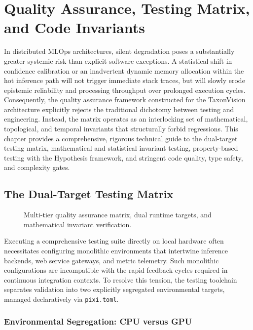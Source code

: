 \chapter{Quality Assurance, Testing Matrix, and Code Invariants}
\label{ch:quality_assurance}

In distributed MLOps architectures, silent degradation poses a substantially greater systemic risk than explicit software exceptions. A statistical shift in confidence calibration or an inadvertent dynamic memory allocation within the hot inference path will not trigger immediate stack traces, but will slowly erode epistemic reliability and processing throughput over prolonged execution cycles. Consequently, the quality assurance framework constructed for the TaxonVision architecture explicitly rejects the traditional dichotomy between testing and engineering. Instead, the matrix operates as an interlocking set of mathematical, topological, and temporal invariants that structurally forbid regressions. This chapter provides a comprehensive, rigorous technical guide to the dual-target testing matrix, mathematical and statistical invariant testing, property-based testing with the Hypothesis framework, and stringent code quality, type safety, and complexity gates.

\section{The Dual-Target Testing Matrix}
\label{sec:dual_target_matrix}

\begin{figure}[htbp]
\centering

\caption{Multi-tier quality assurance matrix, dual runtime targets, and mathematical invariant verification.}
\label{fig:quality_assurance_and_invariants}
\end{figure}

Executing a comprehensive testing suite directly on local hardware often necessitates configuring monolithic environments that intertwine inference backends, web service gateways, and metric telemetry. Such monolithic configurations are incompatible with the rapid feedback cycles required in continuous integration contexts. To resolve this tension, the testing toolchain separates validation into two explicitly segregated environmental targets, managed declaratively via \texttt{pixi.toml}.

\subsection{Environmental Segregation: CPU versus GPU}

